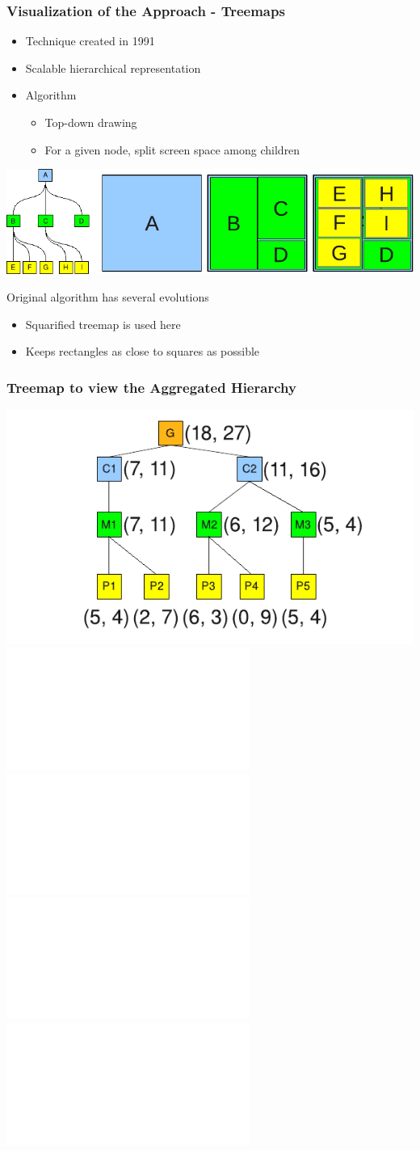\frame
{
   \frametitle{Visualization of the Approach - Treemaps}
   \begin{itemize}
      \item Technique created in 1991
      \item Scalable hierarchical representation
      \item Algorithm
	 \begin{itemize}
	    \item Top-down drawing
	    \item For a given node, split screen space among children
	 \end{itemize}
   \end{itemize}

   \vfill

   \begin{minipage}{\textwidth}
   \centering
   \includegraphics[width=\textwidth]{img/treemap-notion.pdf}
   \end{minipage}

   \vfill

   \begin{block}{Original algorithm has several evolutions}
   \begin{itemize}
      \item Squarified treemap is used here
      \item Keeps rectangles as close to squares as possible
   \end{itemize}
   \end{block}
}

\frame
{
   \frametitle{Treemap to view the Aggregated Hierarchy}

   \begin{minipage}{\textwidth}
   \centering
   \includegraphics[width=.7\textwidth]{img/agg-aggmodel-overall-4.pdf}\\
   \includegraphics<1>[width=.28\textwidth]{img/agg-aggmodel-treemap-1.pdf}
   \includegraphics<2>[width=.28\textwidth]{img/agg-aggmodel-treemap-2.pdf}
   \includegraphics<3>[width=.28\textwidth]{img/agg-aggmodel-treemap-3.pdf}
   \includegraphics<4>[width=.28\textwidth]{img/agg-aggmodel-treemap-4.pdf}
   \end{minipage}
}

